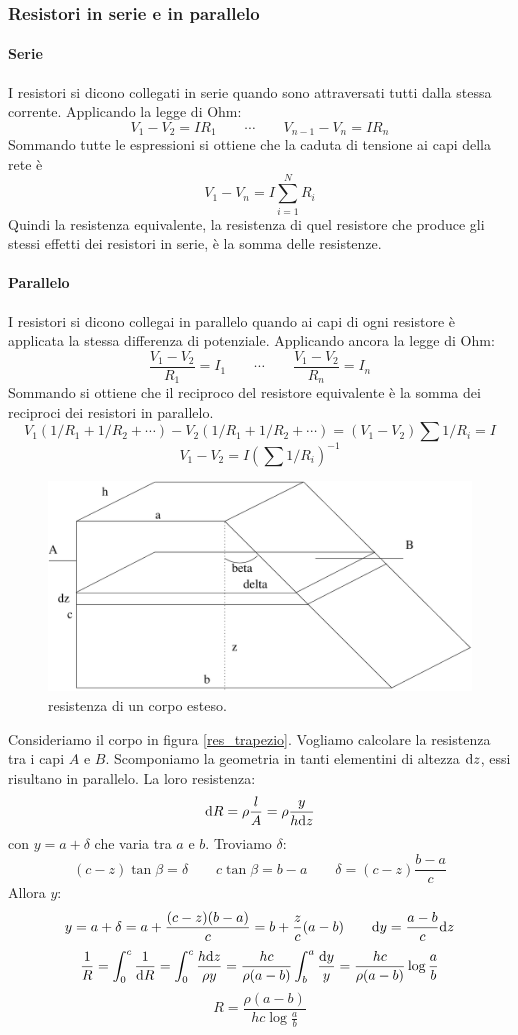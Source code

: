 \subsubsection{Resistori in serie e in parallelo}
\paragraph{Serie}
I resistori si dicono collegati in serie quando sono attraversati tutti dalla stessa corrente. Applicando la legge di Ohm:
\[V_1-V_2=IR_1\qquad \cdots \qquad V_{n-1}-V_{n}=IR_n\]
Sommando tutte le espressioni si ottiene che la caduta di tensione ai capi della rete è
\[V_1-V_n=I\sum_{i=1}^N R_i\]
Quindi la resistenza equivalente, la resistenza di quel resistore che produce gli stessi effetti dei resistori in serie, è la somma delle resistenze.
\paragraph{Parallelo}
I resistori si dicono collegai in parallelo quando ai capi di ogni resistore è applicata la stessa differenza di potenziale. Applicando ancora la legge di Ohm:
\[\frac{V_1-V_2}{R_1}=I_1\qquad\cdots\qquad\frac{V_1-V_2}{R_n}=I_n\]
Sommando si ottiene che il reciproco del resistore equivalente è la somma dei reciproci dei resistori in parallelo.
\[
  V_1(1/R_1+1/R_2+\cdots)-V_2(1/R_1+1/R_2+\cdots) = (V_1 - V_2) \sum 1/R_i  = I
\]
\[
  V_1 - V_2 = I \left( \sum 1/R_i \right)^{-1}
\]
\begin{Es}
  \begin{figure}[htbp]
    \centering
    \includegraphics[scale=0.5]{immagini/fisica2/res_trapezio}
    \caption{resistenza di un corpo esteso.}
    \label{res_trapezio}
  \end{figure}
  Consideriamo il corpo in figura \eqref{res_trapezio}. Vogliamo calcolare la resistenza tra i capi $A$ e $B$. Scomponiamo la geometria in tanti elementini di altezza $\mathrm{d} z$, essi risultano in parallelo. La loro resistenza:
  \[\mathrm{d} R=\rho\frac{l}{A}=\rho\frac{y}{h\mathrm{d} z}\]
  con $y=a+\delta$ che varia tra $a$ e $b$. Troviamo $\delta$:
  \[
    (c-z)\tan\beta=\delta\qquad c\tan\beta=b-a\qquad \delta=(c-z)\frac{b-a}{c}
  \]
  Allora $y$:
  \[y=a+\delta=a+\frac{(c-z)(b-a)}{c}=b+\frac{z}{c}(a-b)\qquad\mathrm{d} y=\frac{a-b}{c}\mathrm{d} z\]
  \[\frac{1}{R}=\int_0^c\frac{1}{\mathrm{d} R}=\int_0^c\frac{h\mathrm{d} z}{\rho y}=\frac{hc}{\rho(a-b)}\int_b^a\frac{\mathrm{d} y}{y}=\frac{hc}{\rho(a-b)}\log\frac{a}{b}\]
  \[R=\frac{\rho(a-b)}{hc\log\frac{a}{b}}\]


\end{Es}
